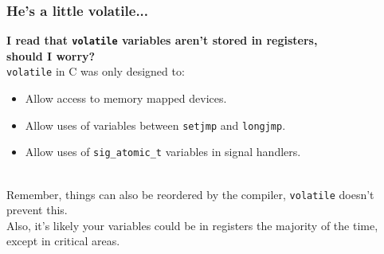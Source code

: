 \begin{frame}[fragile]
  \frametitle{He's a little volatile...}

  \large
  {\bf I read that {\tt volatile} variables aren't stored in registers,\\
     should I worry?}\\[1em]

    {\tt volatile} in C was only designed to:
      \begin{itemize}
        \item Allow access to memory mapped devices.
        \item Allow uses of variables between {\tt setjmp} and {\tt longjmp}.
        \item Allow uses of {\tt sig\_atomic\_t} variables in signal handlers.
      \end{itemize}~\\[1em]
    Remember, things can also be reordered by the compiler,
      {\tt volatile} doesn't prevent this.\\[1em]
    Also, it's likely your variables could be in registers the majority
      of the time, except in critical areas.
  
\end{frame}



